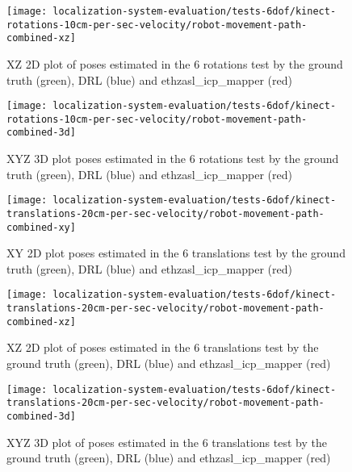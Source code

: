 \begin{figure}[H]
	\centering
	\hspace*{0.25cm}\texttt{[image: localization-system-evaluation/tests-6dof/kinect-rotations-10cm-per-sec-velocity/robot-movement-path-combined-xz]}
	\caption{XZ 2D plot of poses estimated in the 6  rotations test by the ground truth (green), DRL (blue) and ethzasl\_icp\_mapper (red)}
	\label{fig:localization-system-evaluation_kinect-rotations-robot-movement-path-combined-xz}
\end{figure}

\begin{figure}[H]
	\centering
	\texttt{[image: localization-system-evaluation/tests-6dof/kinect-rotations-10cm-per-sec-velocity/robot-movement-path-combined-3d]}
	\caption{XYZ 3D plot poses estimated in the 6  rotations test by the ground truth (green), DRL (blue) and ethzasl\_icp\_mapper (red)}
	\label{fig:localization-system-evaluation_kinect-rotations-robot-movement-path-combined-3d}
\end{figure}


\begin{figure}[H]
	\centering
	\texttt{[image: localization-system-evaluation/tests-6dof/kinect-translations-20cm-per-sec-velocity/robot-movement-path-combined-xy]}
	\caption{XY 2D plot poses estimated in the 6  translations test by the ground truth (green), DRL (blue) and ethzasl\_icp\_mapper (red)}
	\label{fig:localization-system-evaluation_kinect-translations-robot-movement-path-combined-xy}
\end{figure}

\begin{figure}[H]
	\centering
	\hspace*{0.25cm}\texttt{[image: localization-system-evaluation/tests-6dof/kinect-translations-20cm-per-sec-velocity/robot-movement-path-combined-xz]}
	\caption{XZ 2D plot of poses estimated in the 6  translations test by the ground truth (green), DRL (blue) and ethzasl\_icp\_mapper (red)}
	\label{fig:localization-system-evaluation_kinect-translations-robot-movement-path-combined-xz}
\end{figure}

\begin{figure}[H]
	\centering
	\texttt{[image: localization-system-evaluation/tests-6dof/kinect-translations-20cm-per-sec-velocity/robot-movement-path-combined-3d]}
	\caption{XYZ 3D plot of poses estimated in the 6  translations test by the ground truth (green), DRL (blue) and ethzasl\_icp\_mapper (red)}
	\label{fig:localization-system-evaluation_kinect-translations-robot-movement-path-combined-3d}
\end{figure}

